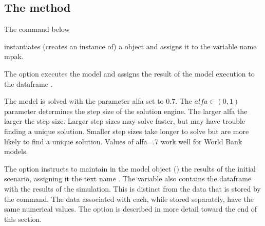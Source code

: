 \documentclass[letterpaper,10pt,english]{jupyterBook}
\begin{document}
\subsection{The  method}
\label{\detokenize{content/05_WBModels/LoadingWBModel:the-modelload-method}}
\sphinxAtStartPar
The command below

\begin{sphinxVerbatim}[commandchars=\\\{\}]
    
\end{sphinxVerbatim}

\sphinxAtStartPar
instantiates (creates an instance of) a  object and assigns it to the variable name mpak.

\sphinxAtStartPar
The  option executes the model and assigns the result of the model execution to the dataframe .

\sphinxAtStartPar
The model is solved with the parameter alfa set to 0.7.  The \(alfa \in (0,1)\) parameter determines the step size of the solution engine. The larger alfa the larger the step size. Larger step sizes may solve faster, but may have trouble finding a unique solution.  Smaller step sizes take longer to solve but are more likely to find a unique solution.  Values of alfa=.7 work well for World Bank models.

\sphinxAtStartPar
The  option instructs  to maintain in the model object () the results of the initial scenario, assigning it the text name .   The variable  also contains the dataframe with the results of the simulation.  This is distinct from the data that is stored by the  command. The data associated with each, while stored separately, have the same numerical values. The  option is described in more detail toward the end of this section.
\end{document}
